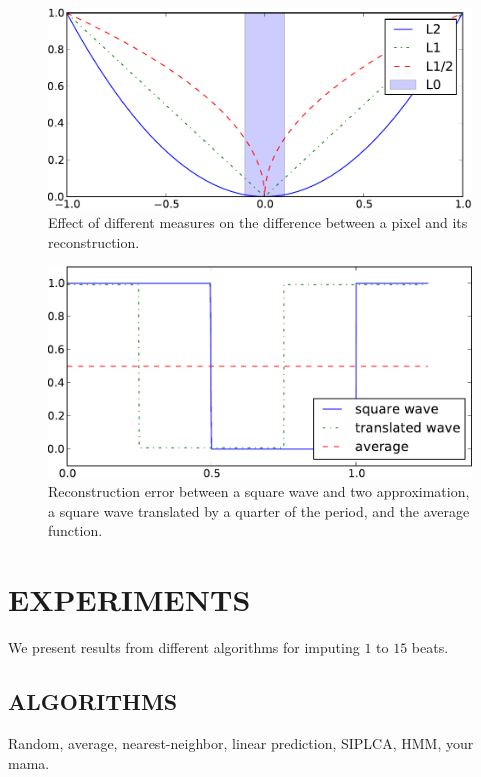 \documentclass{article}
\begin{document}
\begin{figure}[t]
\begin{center}
\includegraphics[width=.95\columnwidth]{measures}
\end{center}
\caption{Effect of different measures on the difference between a pixel
and its reconstruction.
\label{fig:measures}}
\end{figure}

\begin{figure}[t]
\begin{center}
\includegraphics[width=.90\columnwidth]{square}
\end{center}
\caption{Reconstruction error between a square wave and two approximation,
a square wave translated by a quarter of the period, and the average
function.
\label{fig:square}}
\end{figure}

\section{EXPERIMENTS}
\label{sec:exp}
We present results from different algorithms for imputing $1$ to
$15$ beats.

\subsection{ALGORITHMS}
\label{ssec:algo}
Random, average, nearest-neighbor, linear prediction, SIPLCA, HMM,
your mama.
\end{document}
